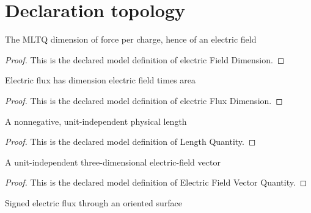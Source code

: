 \section{Declaration topology}
\begin{definition}
  \label{def:physics:phyx-mini-0843:phyxminiproblems-problemphyxmini0843-electricfielddimension}
  The MLTQ dimension of force per charge, hence of an electric field
\end{definition}
\begin{proof}
  This is the declared model definition of electric Field Dimension.
\end{proof}
\begin{definition}
  \label{def:physics:phyx-mini-0843:phyxminiproblems-problemphyxmini0843-electricfluxdimension}
  Electric flux has dimension electric field times area
\end{definition}
\begin{proof}
  This is the declared model definition of electric Flux Dimension.
\end{proof}
\begin{definition}
  \label{def:physics:phyx-mini-0843:phyxminiproblems-problemphyxmini0843-lengthquantity}
  A nonnegative, unit-independent physical length
\end{definition}
\begin{proof}
  This is the declared model definition of Length Quantity.
\end{proof}
\begin{definition}
  \label{def:physics:phyx-mini-0843:phyxminiproblems-problemphyxmini0843-electricfieldvectorquantity}
  A unit-independent three-dimensional electric-field vector
\end{definition}
\begin{proof}
  This is the declared model definition of Electric Field Vector Quantity.
\end{proof}
\begin{definition}
  \label{def:physics:phyx-mini-0843:phyxminiproblems-problemphyxmini0843-electricfluxquantity}
  Signed electric flux through an oriented surface
\end{definition}

